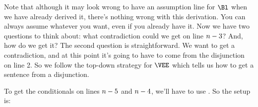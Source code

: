 Note that although it may look wrong to have an assumption line for $\Bl$ when we have already derived it, there's nothing wrong with this derivation. 
You can always assume whatever you want, even if you already have it. 
Now we have two questions to think about: what contradiction could we get on line $n-3$? 
And, how do we get it? 
The second question is straightforward. 
We want to get a contradiction, and at this point it's going to have to come from the disjunction on line 2. 
So we follow the top-down strategy for $\VEE$ which tells us how to get a sentence from a disjunction.
\begin{gproof}
\end{gproof}
To get the conditionals on lines $n-5$ and $n-4$, we'll have to use . So the setup is:
